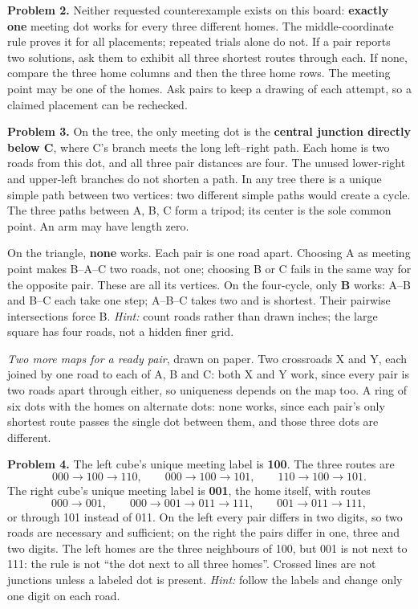 \documentclass[11pt,letterpaper]{article}
\begin{document}
\textbf{Problem 2.} Neither requested counterexample exists on this board: \textbf{exactly one} meeting dot works for every three different homes. The middle-coordinate rule proves it for all placements; repeated trials alone do not. If a pair reports two solutions, ask them to exhibit all three shortest routes through each. If none, compare the three home columns and then the three home rows. The meeting point may be one of the homes. Ask pairs to keep a drawing of each attempt, so a claimed placement can be rechecked.

\textbf{Problem 3.} On the tree, the only meeting dot is the \textbf{central junction directly below C}, where C's branch meets the long left--right path. Each home is two roads from this dot, and all three pair distances are four. The unused lower-right and upper-left branches do not shorten a path. In any tree there is a unique simple path between two vertices: two different simple paths would create a cycle. The three paths between A, B, C form a tripod; its center is the sole common point. An arm may have length zero.

On the triangle, \textbf{none} works. Each pair is one road apart. Choosing A as meeting point makes B--A--C two roads, not one; choosing B or C fails in the same way for the opposite pair. These are all its vertices. On the four-cycle, only \textbf{B} works: A--B and B--C each take one step; A--B--C takes two and is shortest. Their pairwise intersections force B. \emph{Hint:} count roads rather than drawn inches; the large square has four roads, not a hidden finer grid.

\emph{Two more maps for a ready pair}, drawn on paper. Two crossroads X and Y, each joined by one road to each of A, B and C: both X and Y work, since every pair is two roads apart through either, so uniqueness depends on the map too. A ring of six dots with the homes on alternate dots: none works, since each pair's only shortest route passes the single dot between them, and those three dots are different.

\textbf{Problem 4.} The left cube's unique meeting label is \textbf{100}. The three routes are
\[
000\!\to\!100\!\to\!110,\qquad
000\!\to\!100\!\to\!101,\qquad
110\!\to\!100\!\to\!101.
\]
The right cube's unique meeting label is \textbf{001}, the home itself, with routes
\[
000\!\to\!001,\qquad
000\!\to\!001\!\to\!011\!\to\!111,\qquad
001\!\to\!011\!\to\!111,
\]
or through 101 instead of 011. On the left every pair differs in two digits, so two roads are necessary and sufficient; on the right the pairs differ in one, three and two digits. The left homes are the three neighbours of 100, but 001 is not next to 111: the rule is not ``the dot next to all three homes''. Crossed lines are not junctions unless a labeled dot is present. \emph{Hint:} follow the labels and change only one digit on each road.
\end{document}
